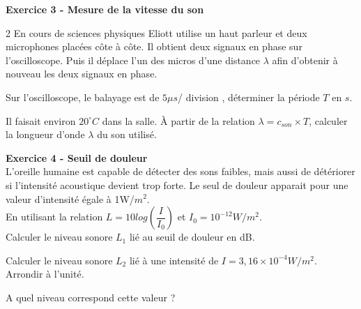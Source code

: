 \documentclass[11pt,a4paper]{article}
\newcommand{\cadreblanc}[1]{%
\medskip\framebox[\linewidth][c]{%
\rule{0mm}{#1mm}}\par
\medskip}
\begin{document}
\textbf{Exercice 3 - Mesure de la vitesse du son}
\begin{multicols}{2}
En cours de sciences physiques Eliott utilise un haut parleur et deux microphones placées côte à côte. Il obtient deux signaux en phase sur l'oscilloscope. Puis il déplace l'un des micros d'une distance $\lambda$ afin d'obtenir à nouveau les deux signaux en phase. 
\begin{center}
    
\def\scl{0.5}%
\end{center} 
\end{multicols}
 Sur l'oscilloscope, le balayage est de $5 \mu s $/ division , déterminer la période $T$ en $s$.\\
\cadreblanc{25}

 Il faisait environ $20 ^\circ C $ dans la salle. \`A partir de la relation $\lambda = c_{son} \times T$, calculer la longueur d'onde $\lambda$  du son utilisé.\\
\cadreblanc{25} 


\textbf{Exercice 4 - Seuil de douleur}\\
L'oreille humaine est capable de détecter des sons faibles, mais aussi de détériorer si l'intensité acoustique devient trop forte. Le seul de douleur apparait pour une valeur d'intensité égale à 1W/$m^2$.\\[3pt]
En utilisant la relation $L=10 log \left(\dfrac{I}{I_0}\right)$ et $I_0=10^{-12}W/m^2$.\\

 Calculer le niveau sonore $L_1$ lié au seuil de douleur en dB.\\
\cadreblanc{12}
 Calculer le niveau sonore $L_2$ lié à une intensité de $I=3,16 \times 10^{-4} W/m^2$. Arrondir à l'unité. \\
\cadreblanc{12}
 A quel niveau correspond cette valeur ?\\
\cadreblanc{15}
\end{document}
